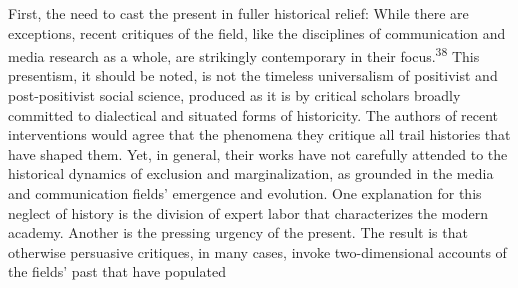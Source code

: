 \documentclass{tufte-handout}
\begin{document}
First, the need to cast the present in fuller historical relief: While
there are exceptions, recent critiques of the field, like the
disciplines of communication and media research as a whole, are
strikingly contemporary in their focus.\textsuperscript{38} This presentism, it should be
noted, is not the timeless universalism of positivist and
post-positivist social science, produced as it is by critical scholars
broadly committed to dialectical and situated forms of historicity. The
authors of recent interventions would agree that the phenomena they
critique all trail histories that have shaped them. Yet, in general,
their works have not carefully attended to the historical dynamics of
exclusion and marginalization, as grounded in the media and
communication fields' emergence and evolution. One explanation for this
neglect of history is the division of expert labor that characterizes
the modern academy. Another is the pressing urgency of the present. The
result is that otherwise persuasive critiques, in many cases, invoke
two-dimensional accounts of the fields' past that have populated
\end{document}
